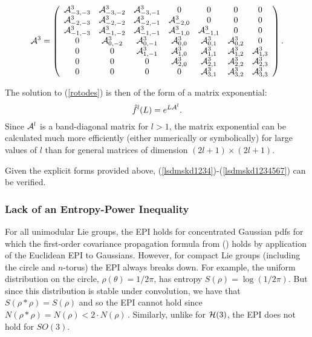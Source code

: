\documentclass{svmult}
\begin{document}
$$ {\cal A}^{3} = \left(\begin{array}{ccccccc}
{\cal A}_{-3,-3}^{3} & {\cal A}_{-3,-2}^{3} & {\cal A}_{-3,-1}^{3} & 0 & 0 & 0 & 0 \\
{\cal A}_{-2,-3}^{3} & {\cal A}_{-2,-2}^{3} & {\cal A}_{-2,-1}^{3} & {\cal A}_{-2,0}^{3}
& 0 & 0 & 0 \\ {\cal A}_{-1,-3}^{3} &
{\cal A}_{-1,-2}^{3} & {\cal A}_{-1,-1}^{3} & {\cal A}_{-1,0}^{3} & {\cal A}_{-1,1}^{3} & 0 & 0 \\ 0 & {\cal A}_{0,-2}^{3} &
{\cal A}_{0,-1}^{3} & {\cal A}_{0,0}^{3} & {\cal A}_{0,1}^{3} & {\cal A}_{0,2}^{3} & 0 \\
0 & 0 & {\cal A}_{1,-1}^{3} & {\cal A}_{1,0}^{3} & {\cal A}_{1,1}^{3} & {\cal A}_{1,2}^{3}
& {\cal A}_{1,3}^{3} \\
0 & 0 & 0 & {\cal A}_{2,0}^{3} & {\cal A}_{2,1}^{3} & {\cal A}_{2,2}^{3}
& {\cal A}_{2,3}^{3} \\
0 & 0 & 0 & 0 & {\cal A}_{3,1}^{3} & {\cal A}_{3,2}^{3}
& {\cal A}_{3,3}^{3}
\end{array} \right). $$

The solution to (\ref{rotodes}) is then
of the form of a matrix exponential:
\begin{equation}
\hat{f}^{l}(L) = e^{L {\cal A}^{l}}.
\label{matexp}
\end{equation}
Since ${\cal A}^l$ is a band-diagonal matrix for $l > 1$, the
matrix exponential can be calculated much more efficiently
(either numerically or symbolically) for large
values of $l$ than for general matrices of dimension
$(2l+1)\times(2l+1)$.

Given the explicit forms provided above, (\ref{lsdmskd1234})-(\ref{lsdmskd1234567}) can be verified.

\subsubsection{Lack of an Entropy-Power Inequality}

For all unimodular Lie groups, the EPI holds for concentrated Gaussian pdfs for which the first-order covariance
propagation formula from (\cite{wangprop1}) holds by application of the Euclidean EPI to Gaussians. However, for compact Lie groups (including the circle and $n$-torus) the EPI always breaks down. For example, the uniform distribution on the circle, $\rho(\theta) = 1/2\pi$, has entropy
$S(\rho) = \log(1/2\pi)$. But since this distribution is stable under convolution, we have that
$S(\rho*\rho) = S(\rho)$ and so the EPI cannot hold since
$N(\rho*\rho) = N(\rho) < 2 \cdot N(\rho) \,.$
Similarly, unlike for ${\cal H}(3)$, the EPI does not hold for $SO(3)$.
\end{document}
